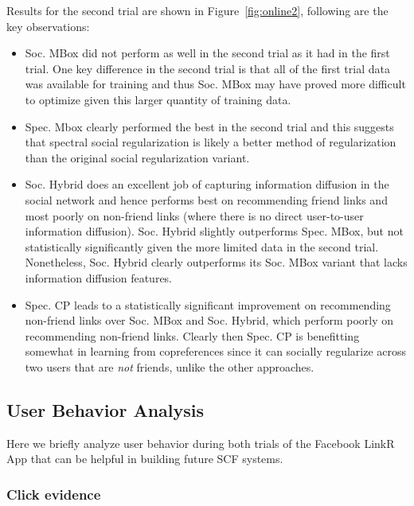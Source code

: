 Results for the second trial are 
shown in Figure~\ref{fig:online2}, following are the key observations:
\begin{itemize}
\item Soc. MBox did not perform as well in the second trial as it had
in the first trial.  One key difference in the second trial is that
all of the first trial data was available for training and thus
Soc. MBox may have proved more difficult to optimize given this larger 
quantity of training data.
\item Spec. Mbox clearly performed the best in the second trial 
and this suggests that spectral social 
regularization is likely a better method of regularization 
than the original social regularization variant.
\item Soc. Hybrid does an excellent job of capturing information diffusion
in the social network and hence performs best on recommending friend
links and most poorly on non-friend links (where there is no direct
user-to-user information diffusion).  Soc. Hybrid slightly outperforms
Spec. MBox, but not statistically significantly given the more limited
data in the second trial.  Nonetheless, 
Soc. Hybrid clearly outperforms its Soc. MBox variant that lacks 
information diffusion features.
\item Spec. CP leads to a statistically significant improvement
on recommending non-friend links over Soc. MBox and Soc. Hybrid,
which perform poorly on recommending non-friend links.  Clearly then
Spec. CP is benefitting somewhat in learning from copreferences
since it can socially regularize across two users that are \emph{not}
friends, unlike the other approaches.
\end{itemize}


\subsection{User Behavior Analysis}

\label{sec:behavior}

Here we briefly analyze user behavior during both trials of the Facebook
LinkR App that can be helpful in building future SCF systems.

\subsubsection{Click evidence}


